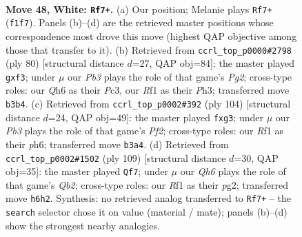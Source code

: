 \documentclass[11pt]{article}
\begin{document}
\clearpage

\begin{figure}[p]\centering
\begin{subfigure}{0.46\textwidth}\centering
\resizebox{\linewidth}{!}{%
\newchessgame
\chessboard[
  setfen={8/3k4/7Q/1qp5/p7/1P6/P7/5RK1 w - - 5 48},
  showmover=false,
  pgfstyle=straightmove, color=movearrow, markmove={f1-f7}
]}
\caption{}
\end{subfigure}\hfill
\begin{subfigure}{0.46\textwidth}\centering
\resizebox{\linewidth}{!}{%
\newchessgame
\chessboard[
  setfen={8/Q7/p7/6p1/8/P1P2pqP/6P1/k6K w - - 0 41},
  showmover=false,
  pgfstyle=straightmove, color=movearrow, markmove={g2-f3}
]}
\caption{}
\end{subfigure}
\\[4pt]
\begin{subfigure}{0.46\textwidth}\centering
\resizebox{\linewidth}{!}{%
\newchessgame
\chessboard[
  setfen={8/4Q3/7p/5q1k/4p3/4P1p1/5P2/6K1 w - - 0 53},
  showmover=false,
  pgfstyle=straightmove, color=movearrow, markmove={f2-g3}
]}
\caption{}
\end{subfigure}\hfill
\begin{subfigure}{0.46\textwidth}\centering
\resizebox{\linewidth}{!}{%
\newchessgame
\chessboard[
  setfen={6k1/1q6/5p2/6p1/5P2/4Q1K1/6P1/8 b - - 0 55},
  showmover=false,
  pgfstyle=straightmove, color=movearrow, markmove={b7-f7}
]}
\caption{}
\end{subfigure}
\caption{\textbf{Move 48, White: \texttt{Rf7+}.} (a) Our position; Melanie plays \texttt{Rf7+} (\texttt{f1f7}). Panels (b)--(d) are the retrieved master positions whose correspondence most drove this move (highest QAP objective among those that transfer to it). (b) Retrieved from \texttt{ccrl\_top\_p0000\#2798} (ply 80) [structural distance $d$=27, QAP obj=84]: the master played \texttt{gxf3}; under $\mu$ our \emph{Pb3} plays the role of that game's \emph{Pg2}; cross-type roles: our \emph{Q}h6 as their \emph{P}c3, our \emph{R}f1 as their \emph{P}h3; transferred move \texttt{b3b4}. (c) Retrieved from \texttt{ccrl\_top\_p0002\#392} (ply 104) [structural distance $d$=24, QAP obj=49]: the master played \texttt{fxg3}; under $\mu$ our \emph{Pb3} plays the role of that game's \emph{Pf2}; cross-type roles: our \emph{R}f1 as their \emph{p}h6; transferred move \texttt{b3a4}. (d) Retrieved from \texttt{ccrl\_top\_p0002\#1502} (ply 109) [structural distance $d$=30, QAP obj=35]: the master played \texttt{Qf7}; under $\mu$ our \emph{Qh6} plays the role of that game's \emph{Qb2}; cross-type roles: our \emph{R}f1 as their \emph{p}g2; transferred move \texttt{h6h2}. Synthesis: no retrieved analog transferred to \texttt{Rf7+} -- the \texttt{search} selector chose it on value (material / mate); panels (b)--(d) show the strongest nearby analogies.}
\label{fig:thought-m94}
\end{figure}
\end{document}
